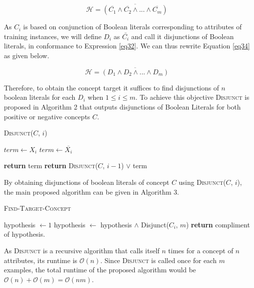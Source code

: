 \begin{equation}\label{eq34}
\mathcal{H} = \overline{(\overline{C_1}\wedge \overline{C_2} \wedge ... \wedge \overline{C_m})}
\end{equation}

As $C_i$ is based on conjunction of Boolean literals corresponding to attributes of training instances, we will define $D_i$ as $\bar{C_i}$ and call it disjunctions of Boolean literals, in conformance to Expression \ref{eq32}. We can thus rewrite Equation \ref{eq34} as given below.

\begin{equation}\label{eq35}
\mathcal{H} = \overline{(D_1 \wedge D_2 \wedge ... \wedge D_m)}
\end{equation}

Therefore, to obtain the concept target it suffices to find disjunctions of $n$ boolean literals for each $D_i$ when $1 \leq i \leq m$. To achieve this objective \textsc{Disjunct} is proposed in Algorithm 2 that outputs disjunctions of Boolean Literals for both positive or negative concepts $C$.

\begin{algorithm}[H]
\caption{\textsc{Disjunct}($C$, $i$)}
\begin{algorithmic}[1]
\State $term \leftarrow X_i$
\Else
\State $term \leftarrow \overline{X_i}$
\EndIf

\State \textbf{return} term
\Else
\State \textbf{return} \textsc{Disjunct}($C$, $i-1$) $\vee$ term
\EndIf
\end{algorithmic}
\end{algorithm}

By obtaining disjunctions of boolean literals of concept $C$ using \textsc{Disjunct}($C$, $i$), the main proposed algorithm can be given in Algorithm 3.

\begin{algorithm}[H]
\caption{\textsc{Find-Target-Concept}}
\begin{algorithmic}[1]
\State hypothesis $\leftarrow 1$
\State hypothesis $\leftarrow$ hypothesis $\wedge$ Disjunct($C_i$, $m$)
\EndFor
\State \textbf{return} compliment of hypothesis.
\end{algorithmic}
\end{algorithm}

As \textsc{Disjunct} is a recursive algorithm that calls itself $n$ times for a concept of $n$ attributes, its runtime is $\mathcal{O}(n)$. Since \textsc{Disjunct} is called once for each $m$ examples, the total runtime of the proposed algorithm would be $\mathcal{O}(n) + \mathcal{O}(m) = \mathcal{O}(nm)$.
